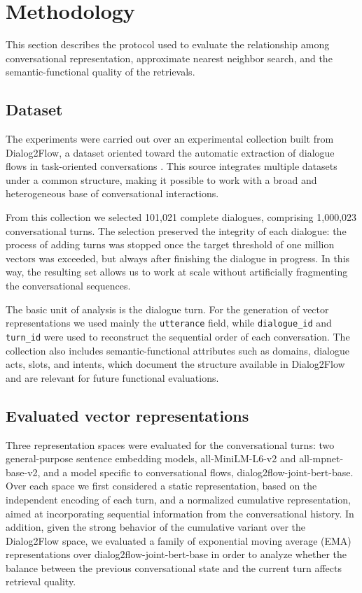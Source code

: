 \documentclass[runningheads]{llncs}
\begin{document}
\section{Methodology}
\label{sec:methodology}

This section describes the protocol used to evaluate the relationship among conversational representation, approximate nearest neighbor search, and the semantic-functional quality of the retrievals.

\subsection{Dataset}

The experiments were carried out over an experimental collection built from Dialog2Flow, a dataset oriented toward the automatic extraction of dialogue flows in task-oriented conversations \cite{burdisso2024dialog2flow}. This source integrates multiple datasets under a common structure, making it possible to work with a broad and heterogeneous base of conversational interactions.

From this collection we selected 101{,}021 complete dialogues, comprising 1{,}000{,}023 conversational turns. The selection preserved the integrity of each dialogue: the process of adding turns was stopped once the target threshold of one million vectors was exceeded, but always after finishing the dialogue in progress. In this way, the resulting set allows us to work at scale without artificially fragmenting the conversational sequences.

The basic unit of analysis is the dialogue turn. For the generation of vector representations we used mainly the \texttt{utterance} field, while \texttt{dialogue\_id} and \texttt{turn\_id} were used to reconstruct the sequential order of each conversation. The collection also includes semantic-functional attributes such as domains, dialogue acts, slots, and intents, which document the structure available in Dialog2Flow and are relevant for future functional evaluations.


\subsection{Evaluated vector representations}

Three representation spaces were evaluated for the conversational turns: two general-purpose sentence embedding models, all-MiniLM-L6-v2 and all-mpnet-base-v2, and a model specific to conversational flows, dialog2flow-joint-bert-base. Over each space we first considered a static representation, based on the independent encoding of each turn, and a normalized cumulative representation, aimed at incorporating sequential information from the conversational history. In addition, given the strong behavior of the cumulative variant over the Dialog2Flow space, we evaluated a family of exponential moving average (EMA) representations over dialog2flow-joint-bert-base in order to analyze whether the balance between the previous conversational state and the current turn affects retrieval quality.
\end{document}
